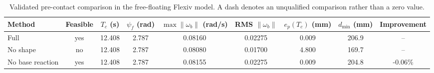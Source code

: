 \begin{table}[t]
\centering
\caption{Validated pre-contact comparison in the free-floating Flexiv model. A dash denotes an unqualified comparison rather than a zero value.}
\label{tab:precontact_comparison}
\begin{tabular}{lcccccccc}
\toprule
Method & Feasible & $T_c$ (s) & $\psi_f$ (rad) & $\max\|\omega_b\|$ (rad/s) & RMS $\|\omega_b\|$ & $e_p(T_c)$ (mm) & $d_{\min}$ (mm) & Improvement \\
\midrule
Full & yes & 12.408 & 2.787 & 0.08160 & 0.02275 & 0.009 & 206.9 & -- \\
No shape & no & 12.408 & 2.787 & 0.08080 & 0.01700 & 4.800 & 169.7 & -- \\
No base reaction & yes & 12.408 & 2.787 & 0.08155 & 0.02275 & 0.009 & 204.8 & -0.06\% \\
\bottomrule
\end{tabular}
\end{table}
